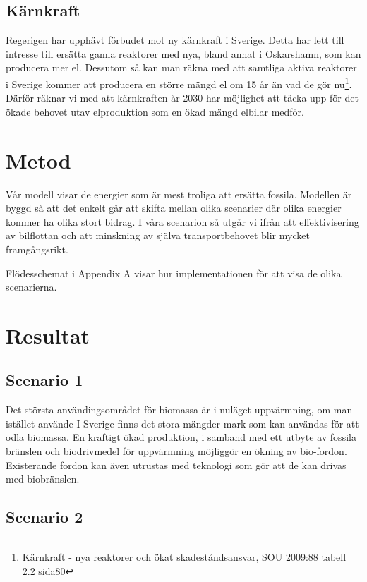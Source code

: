 \documentclass[a4paper,11pt,fleqn, titlepage]{article}
\begin{document}
\subsection{Kärnkraft}
Regerigen har upphävt förbudet mot ny kärnkraft i Sverige. Detta har lett till intresse till ersätta gamla reaktorer med nya, bland annat i Oskarshamn, som kan producera mer el.
Dessutom så kan man räkna med att samtliga aktiva reaktorer i Sverige kommer att producera en större mängd el om 15 år än vad de gör nu\footnote{Kärnkraft - nya reaktorer och ökat skadeståndsansvar, SOU 2009:88  tabell 2.2 sida80}. Därför räknar vi med att kärnkraften år 2030 har möjlighet att täcka upp för det ökade behovet utav elproduktion som en ökad mängd elbilar medför.

\section{Metod}

Vår modell visar de energier som är mest troliga att ersätta fossila.
Modellen är byggd så att det enkelt går att skifta mellan olika scenarier
där olika energier kommer ha olika stort bidrag. I våra scenarion så utgår
vi ifrån att effektivisering av bilflottan och att minskning av själva
transportbehovet blir mycket framgångsrikt.


Flödesschemat i Appendix A visar hur implementationen för att visa de olika
scenarierna.

\section{Resultat}

\subsection{Scenario 1}

Det största användingsområdet för biomassa är i nuläget uppvärmning, om man istället använde
I Sverige finns det stora mängder mark som kan användas för att odla biomassa. En kraftigt ökad produktion, i samband med ett utbyte av fossila bränslen och biodrivmedel för uppvärmning möjliggör en ökning av bio-fordon. Existerande fordon kan även utrustas med teknologi som gör att de kan drivas med biobränslen.

\subsection{Scenario 2}
\end{document}
